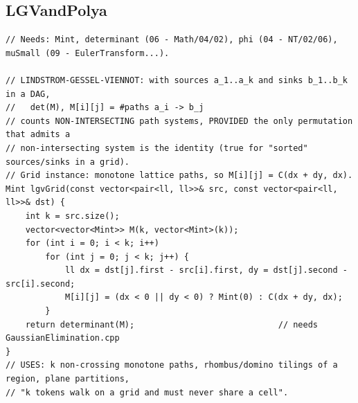 \documentclass[9pt,a4paper,twocolumn]{extarticle}
\begin{document}
\filbreak
\subsection{LGVandPolya}
\nopagebreak
\begin{lstlisting}
// Needs: Mint, determinant (06 - Math/04/02), phi (04 - NT/02/06), muSmall (09 - EulerTransform...).

// LINDSTROM-GESSEL-VIENNOT: with sources a_1..a_k and sinks b_1..b_k in a DAG,
//   det(M), M[i][j] = #paths a_i -> b_j
// counts NON-INTERSECTING path systems, PROVIDED the only permutation that admits a
// non-intersecting system is the identity (true for "sorted" sources/sinks in a grid).
// Grid instance: monotone lattice paths, so M[i][j] = C(dx + dy, dx).
Mint lgvGrid(const vector<pair<ll, ll>>& src, const vector<pair<ll, ll>>& dst) {
    int k = src.size();
    vector<vector<Mint>> M(k, vector<Mint>(k));
    for (int i = 0; i < k; i++)
        for (int j = 0; j < k; j++) {
            ll dx = dst[j].first - src[i].first, dy = dst[j].second - src[i].second;
            M[i][j] = (dx < 0 || dy < 0) ? Mint(0) : C(dx + dy, dx);
        }
    return determinant(M);                             // needs GaussianElimination.cpp
}
// USES: k non-crossing monotone paths, rhombus/domino tilings of a region, plane partitions,
// "k tokens walk on a grid and must never share a cell".


\end{lstlisting}
\end{document}
